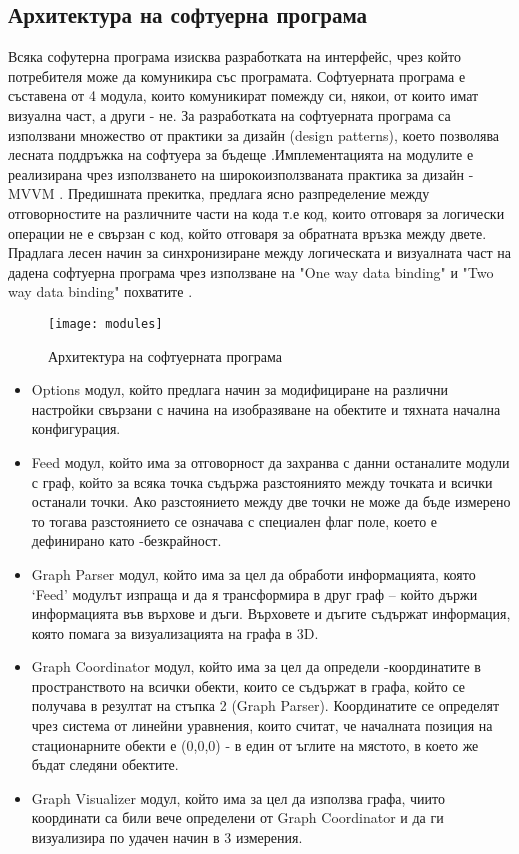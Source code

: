 \subsection{Архитектура на софтуерна програма}
Всяка софутерна програма изисква разработката на интерфейс, чрез който потребителя може да комуникира със програмата. Софтуерната програма е съставена от 4 модула, които комуникират помежду си, някои, от които имат визуална част, а други - не.
За разработката на софтуерната програма са използвани множество от практики за дизайн (design patterns), което позволява лесната поддръжка на софтуера за бъдеще \cite{patterns}.Имплементацията на модулите е реализирана чрез използването на широкоизползваната практика за дизайн - MVVM \cite{mvvm}. Предишната прекитка, предлага ясно разпределение между отговорностите на различните части на кода т.е код, които отговаря за логически операции не е свързан с код, който отговаря за обратната връзка между двете. Прадлага лесен начин за синхронизиране между логическата и визуалната част на дадена софтуерна програма чрез използване на "One way data binding" и "Two way data binding" похватите \cite{dataBinding}.

\begin{figure}
    \texttt{[image: modules]}
    \caption{Архитектура на софтуерната програма}
    \label{fig:architecture}
\end{figure}

\begin{itemize}
    \item Options модул, който предлага начин за модифициране на различни настройки свързани с начина на изобразяване на обектите и тяхната начална конфигурация.
    \item Feed  модул, който има за отговорност да захранва с данни останалите модули с граф, който за всяка точка съдържа разстояниято между точката и всички останали точки. Ако разстоянието между две точки не може да бъде измерено то тогава разстоянието се означава с специален флаг поле, което е дефинирано като -безкрайност.
    \item Graph Parser модул, който има за цел да обработи информацията, която ‘Feed’ модулът изпраща и да я трансформира в друг граф – който държи информацията във върхове и дъги. Върховете и 
    дъгите съдържат информация, която помага за визуализацията на графа в 3D.
    \item Graph Coordinator модул, който има за цел да определи -координатите в пространството на всички обекти, които се съдържат в графа, който се получава в резултат на стъпка 2 (Graph Parser). Координатите се определят чрез система от линейни уравнения, които считат, че началната позиция на стационарните обекти е (0,0,0) - в един от ъглите на мястото, в което же бъдат следяни обектите.
    \item Graph Visualizer модул, който има за цел да използва графа, чиито координати са били вече определени от Graph Coordinator и да ги визуализира по удачен начин в 3 измерения.

\end{itemize}

